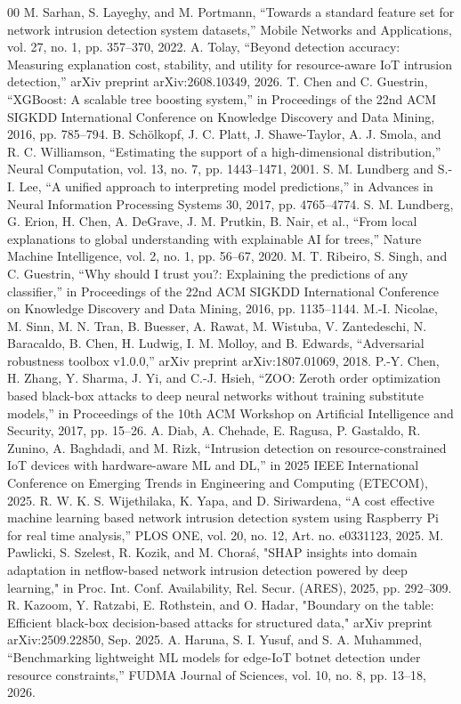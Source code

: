 \documentclass[conference]{IEEEtran}
\begin{document}
\begin{thebibliography}{00}
 M. Sarhan, S. Layeghy, and M. Portmann, ``Towards a standard feature set for network intrusion detection system datasets,'' Mobile Networks and Applications, vol. 27, no. 1, pp. 357--370, 2022.
 A. Tolay, ``Beyond detection accuracy: Measuring explanation cost, stability, and utility for resource-aware IoT intrusion detection,'' arXiv preprint arXiv:2608.10349, 2026.
 T. Chen and C. Guestrin, ``XGBoost: A scalable tree boosting system,'' in Proceedings of the 22nd ACM SIGKDD International Conference on Knowledge Discovery and Data Mining, 2016, pp. 785--794.
 B. Schölkopf, J. C. Platt, J. Shawe-Taylor, A. J. Smola, and R. C. Williamson, ``Estimating the support of a high-dimensional distribution,'' Neural Computation, vol. 13, no. 7, pp. 1443--1471, 2001.
 S. M. Lundberg and S.-I. Lee, ``A unified approach to interpreting model predictions,'' in Advances in Neural Information Processing Systems 30, 2017, pp. 4765--4774.
 S. M. Lundberg, G. Erion, H. Chen, A. DeGrave, J. M. Prutkin, B. Nair, et al., ``From local explanations to global understanding with explainable AI for trees,'' Nature Machine Intelligence, vol. 2, no. 1, pp. 56--67, 2020.
 M. T. Ribeiro, S. Singh, and C. Guestrin, ``Why should I trust you?: Explaining the predictions of any classifier,'' in Proceedings of the 22nd ACM SIGKDD International Conference on Knowledge Discovery and Data Mining, 2016, pp. 1135--1144.
 M.-I. Nicolae, M. Sinn, M. N. Tran, B. Buesser, A. Rawat, M. Wistuba, V. Zantedeschi, N. Baracaldo, B. Chen, H. Ludwig, I. M. Molloy, and B. Edwards, ``Adversarial robustness toolbox v1.0.0,'' arXiv preprint arXiv:1807.01069, 2018.
 P.-Y. Chen, H. Zhang, Y. Sharma, J. Yi, and C.-J. Hsieh, ``ZOO: Zeroth order optimization based black-box attacks to deep neural networks without training substitute models,'' in Proceedings of the 10th ACM Workshop on Artificial Intelligence and Security, 2017, pp. 15--26.
 A. Diab, A. Chehade, E. Ragusa, P. Gastaldo, R. Zunino, A. Baghdadi, and M. Rizk, ``Intrusion detection on resource-constrained IoT devices with hardware-aware ML and DL,'' in 2025 IEEE International Conference on Emerging Trends in Engineering and Computing (ETECOM), 2025.
 R. W. K. S. Wijethilaka, K. Yapa, and D. Siriwardena, ``A cost effective machine learning based network intrusion detection system using Raspberry Pi for real time analysis,'' PLOS ONE, vol. 20, no. 12, Art. no. e0331123, 2025.
 M. Pawlicki, S. Szelest, R. Kozik, and M. Choraś, "SHAP insights into domain adaptation in netflow-based network intrusion detection powered by deep learning," in Proc. Int. Conf. Availability, Rel. Secur. (ARES), 2025, pp. 292--309.
 R. Kazoom, Y. Ratzabi, E. Rothstein, and O. Hadar, "Boundary on the table: Efficient black-box decision-based attacks for structured data," arXiv preprint arXiv:2509.22850, Sep. 2025.
 A. Haruna, S. I. Yusuf, and S. A. Muhammed, ``Benchmarking lightweight ML models for edge-IoT botnet detection under resource constraints,'' FUDMA Journal of Sciences, vol. 10, no. 8, pp. 13--18, 2026.
\end{thebibliography}
\end{document}

